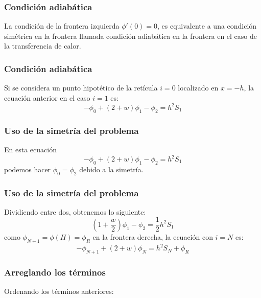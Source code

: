 \begin{frame}
\frametitle{Condición adiabática}
La condición de la frontera izquierda $\phi'(0) = 0$, es equivalente a una condición simétrica en la frontera llamada condición adiabática en la frontera en el caso de la transferencia de calor.
\end{frame}
\begin{frame}
\frametitle{Condición adiabática}
Si se considera un punto hipotético de la retícula $i = 0$ localizado en $x = -h$, la ecuación anterior en el caso $i = 1$ es:
\[-\phi_{0} + (2+w)\phi_{1} - \phi_{2} = h^{2}S_{1} \]
\end{frame}
\begin{frame}
\frametitle{Uso de la simetría del problema}
En esta ecuación
\[-\phi_{0} + (2+w)\phi_{1} - \phi_{2} = h^{2}S_{1} \]
podemos hacer $\phi_{0} = \phi_{2}$ debido a la simetría. 
\end{frame}
\begin{frame}
\frametitle{Uso de la simetría del problema}
Dividiendo entre dos, obtenemos lo siguiente:
\[ (1 + \dfrac{w}{2}) \phi_{1} - \phi_{2} = \dfrac{1}{2} h^{2}S_{1}\]
como $\phi_{N+1}= \phi(H)=\phi_{R}$ en la frontera derecha, la ecuación con $i=N$ es:
\[ -\phi_{N+1} + (2+w) \phi_{N} = h^{2}S_{N} + \phi_{R}\]
\end{frame}
\begin{frame}[fragile]
\frametitle{Arreglando los términos}
Ordenando los términos anteriores:
\\
\medskip
{}
\end{frame}
